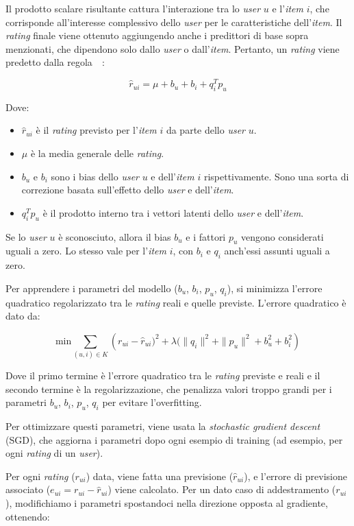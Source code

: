 Il prodotto scalare risultante cattura l'interazione tra lo \textit{user} $u$ e l'\textit{item} $i$, che corrisponde all'interesse complessivo dello \textit{user} per le caratteristiche dell'\textit{item}. Il \textit{rating} finale viene ottenuto aggiungendo anche i predittori di base sopra menzionati, che dipendono solo dallo \textit{user} o dall'\textit{item}. Pertanto, un \textit{rating} viene predetto dalla regola~\cite{SVD_analysis}~\cite{Recommendation_book}:

\[
\hat{r}_{ui} = \mu + b_u + b_i + q_i^T p_u
\]

Dove:
\begin{itemize}
    \item $ \hat{r}_{ui} $ è il \textit{rating} previsto per
    l'\textit{item} $i$ da parte dello \textit{user} $u$.
    \item $ \mu $ è la media generale delle \textit{rating}.
    \item $ b_u $ e $ b_i $ sono i bias dello \textit{user} $u$ e dell'\textit{item} $i$ rispettivamente. Sono una sorta di correzione basata sull'effetto dello \textit{user} e dell'\textit{item}.
    \item $ q_i^T p_u $ è il prodotto interno tra i vettori latenti dello \textit{user} e dell'\textit{item}.
\end{itemize}

Se lo \textit{user} $u$ è sconosciuto, allora il bias $b_u$ e i fattori $p_u$ vengono considerati uguali a zero. Lo stesso vale per
l'\textit{item} $i$, con $b_i$ e $q_i$ anch'essi assunti uguali a zero.

Per apprendere i parametri del modello ($b_u$, $b_i$, $p_u$, $q_i$), si minimizza l'errore quadratico regolarizzato tra le \textit{rating} reali e quelle previste. L'errore quadratico è dato da:

\[
\text{min} \sum_{(u,i) \in K} \left (r_{ui} - \hat{r}_{ui})^2 + \lambda (\|q_i\|^2 + \|p_u\|^2 + b_u^2 + b_i^2 \right)
\]

Dove il primo termine è l'errore quadratico tra le \textit{rating} previste e reali e il secondo termine è la regolarizzazione, che penalizza valori troppo grandi per i parametri $b_u$, $b_i$, $p_u$, $q_i$ per evitare l'overfitting.

Per ottimizzare questi parametri, viene usata la \textit{stochastic gradient descent} (SGD), che aggiorna i parametri dopo ogni  esempio di training (ad esempio, per ogni \textit{rating} di un \textit{user}).

Per ogni \textit{rating} ($r_{ui}$) data, viene fatta una previsione ($\hat{r}_{ui}$), e l'errore di previsione associato ($e_{ui} = r_{ui} - \hat{r}_{ui}$) viene calcolato. Per un dato caso di addestramento ($r_{ui}$), modifichiamo i parametri spostandoci nella
direzione opposta al gradiente, ottenendo:

